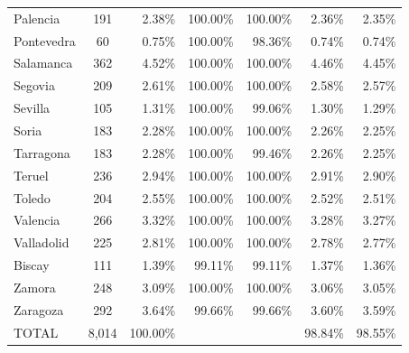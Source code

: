 \documentclass[a4paper,11pt,oneside]{article}
\begin{document}
{\begin{table}
{\begin{tabular}{lcrrrrr}
Palencia           & 191                            & 2.38\%          & 100.00\%      & 100.00\%      & 2.36\%                 & 2.35\%                 \\
Pontevedra         & 60                             & 0.75\%          & 100.00\%      & 98.36\%       & 0.74\%                 & 0.74\%                 \\
Salamanca          & 362                            & 4.52\%          & 100.00\%      & 100.00\%      & 4.46\%                 & 4.45\%                 \\
Segovia            & 209                            & 2.61\%          & 100.00\%      & 100.00\%      & 2.58\%                 & 2.57\%                 \\
Sevilla            & 105                            & 1.31\%          & 100.00\%      & 99.06\%       & 1.30\%                 & 1.29\%                 \\
Soria              & 183                            & 2.28\%          & 100.00\%      & 100.00\%      & 2.26\%                 & 2.25\%                 \\
Tarragona          & 183                            & 2.28\%          & 100.00\%      & 99.46\%       & 2.26\%                 & 2.25\%                 \\
Teruel             & 236                            & 2.94\%          & 100.00\%      & 100.00\%      & 2.91\%                 & 2.90\%                 \\
Toledo             & 204                            & 2.55\%          & 100.00\%      & 100.00\%      & 2.52\%                 & 2.51\%                 \\
Valencia           & 266                            & 3.32\%          & 100.00\%      & 100.00\%      & 3.28\%                 & 3.27\%                 \\
Valladolid         & 225                            & 2.81\%          & 100.00\%      & 100.00\%      & 2.78\%                 & 2.77\%                 \\
Biscay            & 111                            & 1.39\%          & 99.11\%       & 99.11\%       & 1.37\%                 & 1.36\%                 \\
Zamora             & 248                            & 3.09\%          & 100.00\%      & 100.00\%      & 3.06\%                 & 3.05\%                 \\
Zaragoza           & 292                            & 3.64\%          & 99.66\%       & 99.66\%       & 3.60\%                 & 3.59\%                 \\
\midrule
TOTAL              & 8,014                           & 100.00\%        &               &               & 98.84\%                & 98.55\%     \\
\bottomrule
\end{tabular}%
}
\end{table}




}
\end{document}
